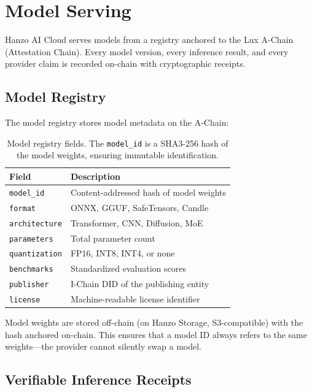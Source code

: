 \section{Model Serving}

\label{sec:serving}

Hanzo AI Cloud serves models from a registry anchored to the Lux A-Chain
(Attestation Chain). Every model version, every inference result, and every
provider claim is recorded on-chain with cryptographic receipts.

\subsection{Model Registry}

The model registry stores model metadata on the A-Chain:

\begin{table}[H]
\centering
\small
\begin{tabular}{lp{6cm}}
\toprule
\textbf{Field} & \textbf{Description} \\
\midrule
\texttt{model\_id} & Content-addressed hash of model weights \\
\texttt{format} & ONNX, GGUF, SafeTensors, Candle \\
\texttt{architecture} & Transformer, CNN, Diffusion, MoE \\
\texttt{parameters} & Total parameter count \\
\texttt{quantization} & FP16, INT8, INT4, or none \\
\texttt{benchmarks} & Standardized evaluation scores \\
\texttt{publisher} & I-Chain DID of the publishing entity \\
\texttt{license} & Machine-readable license identifier \\
\bottomrule
\end{tabular}
\caption{Model registry fields. The \texttt{model\_id} is a SHA3-256 hash of
the model weights, ensuring immutable identification.}
\label{tab:registry}
\end{table}

Model weights are stored off-chain (on Hanzo Storage, S3-compatible) with the
hash anchored on-chain. This ensures that a model ID always refers to the same
weights---the provider cannot silently swap a model.

\subsection{Verifiable Inference Receipts}

